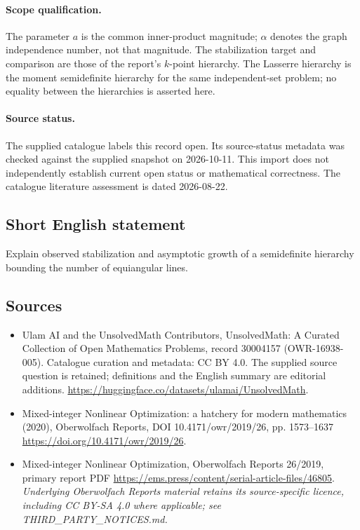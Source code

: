 \documentclass[11pt]{article}
\begin{document}
\paragraph{Scope qualification.}
The parameter $a$ is the common inner-product magnitude; $\alpha$ denotes the graph independence number, not that magnitude. The stabilization target and comparison are those of the report's $k$-point hierarchy. The Lasserre hierarchy is the moment semidefinite hierarchy for the same independent-set problem; no equality between the hierarchies is asserted here.
\paragraph{Source status.}
The supplied catalogue labels this record open. Its source-status metadata was checked against the supplied snapshot on 2026-10-11. This import does not independently establish current open status or mathematical correctness. The catalogue literature assessment is dated 2026-08-22.
\subsection{Short English statement}
Explain observed stabilization and asymptotic growth of a semidefinite hierarchy bounding the number of equiangular lines.
\subsection{Sources}
\begin{itemize}
\item[S1] Ulam AI and the UnsolvedMath Contributors, UnsolvedMath: A Curated Collection of Open Mathematics Problems, record 30004157 (OWR-16938-005). Catalogue curation and metadata: CC BY 4.0. The supplied source question is retained; definitions and the English summary are editorial additions.
\url{https://huggingface.co/datasets/ulamai/UnsolvedMath}.
\item[S2] Mixed-integer Nonlinear Optimization: a hatchery for modern mathematics (2020), Oberwolfach Reports, DOI 10.4171/owr/2019/26, pp. 1573--1637
\url{https://doi.org/10.4171/owr/2019/26}.
\item[S3] Mixed-integer Nonlinear Optimization, Oberwolfach Reports 26/2019, primary report PDF
\url{https://ems.press/content/serial-article-files/46805}.
\textit{Underlying Oberwolfach Reports material retains its source-specific licence, including CC BY-SA 4.0 where applicable; see THIRD\_PARTY\_NOTICES.md.}
\end{itemize}
\end{document}
